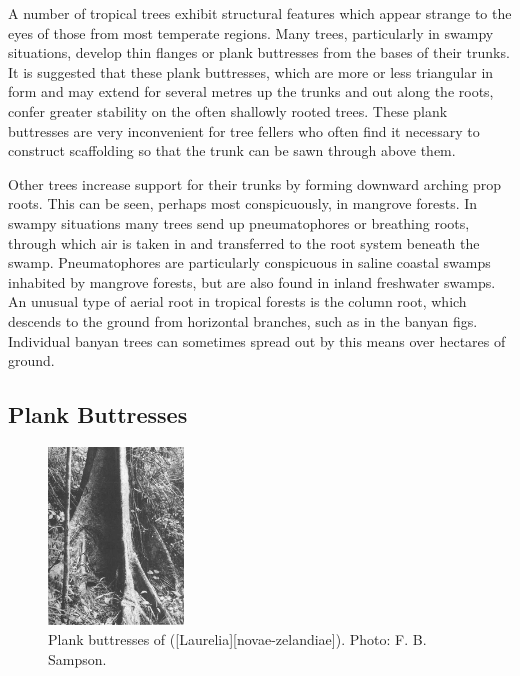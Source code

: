 A number of tropical trees exhibit structural features which appear strange to the eyes of those from most temperate regions.
Many trees, particularly in swampy situations, develop thin flanges or plank buttresses from the bases of their trunks.
It is suggested that these plank buttresses, which are more or less triangular in form and may extend for several metres up the trunks and out along the roots, confer greater stability on the often shallowly rooted trees.
These plank buttresses are very inconvenient for tree fellers who often find it necessary to construct scaffolding so that the trunk can be sawn through above them.

Other trees increase support for their trunks by forming downward arching prop roots.
This can be seen, perhaps most conspicuously, in mangrove forests.
In swampy situations many trees send up pneumatophores or breathing roots, through which air is taken in and transferred to the root system beneath the swamp.
Pneumatophores are particularly conspicuous in saline coastal swamps inhabited by mangrove forests, but are also found in inland freshwater swamps.
An unusual type of aerial root in tropical forests is the column root, which descends to the ground from horizontal branches, such as in the banyan figs.
Individual banyan trees can sometimes spread out by this means over hectares of ground.

\subsection{Plank Buttresses}

\begin{figure}
	\centering
	\includegraphics[width=0.32\textwidth]{graphics/figure9buttresses.jpg}
	\caption[Plank buttresses of pukatea]{Plank buttresses of  ([Laurelia][novae-zelandiae]).
	Photo:  F. B. Sampson.}%
	\label{fig:9buttresses}
\end{figure}

